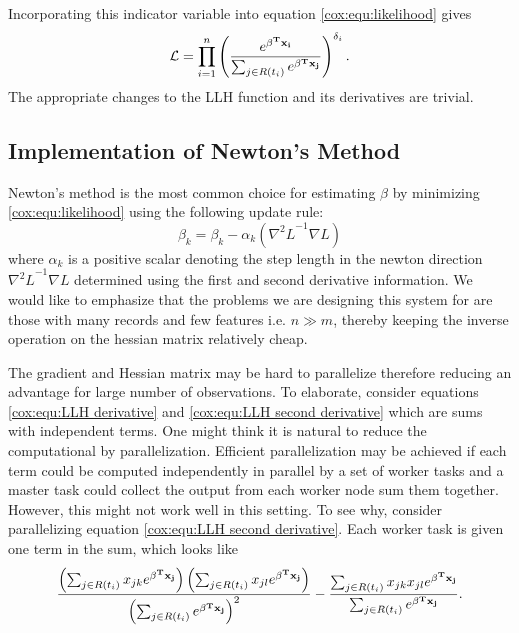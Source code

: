 Incorporating this indicator variable into equation \ref{cox:equ:likelihood} gives
\begin{equation}\label{cox:equ:likelihood-censoring}
\mathcal{L} = \prod_{i = 1}^n \left(  \frac{e^{\bold{\beta^T x_i} }}{ \sum_{j \in R(t_i)} e^{\bold{\beta^T x_j}}} \right)^{\delta_i}.
\end{equation}
The appropriate changes to the LLH function and its derivatives are trivial.


\subsection{Implementation of Newton's Method}
Newton's method is the most common choice for estimating $\beta$ by minimizing
\ref{cox:equ:likelihood} using the following update rule:
\begin{equation}
\beta_{k} = \beta_{k} - \alpha_k \left( {\nabla^2 L}^{-1} \nabla L \right)
\end{equation}
where $\alpha_k$ is a positive scalar denoting the step length in the newton
direction ${\nabla^2 L}^{-1} \nabla L$ determined using the first and second
derivative information. We would like to emphasize that the problems we are
designing this system for are those with many records and few features i.e. $n
\gg m$, thereby keeping the inverse operation on the hessian matrix relatively
cheap.

The gradient and Hessian matrix may be hard to parallelize therefore reducing an
advantage for large number of observations. To elaborate, consider equations
\ref{cox:equ:LLH derivative} and \ref{cox:equ:LLH second derivative} which are
sums with independent terms. One might think it is natural to reduce the
computational by parallelization. Efficient parallelization may be achieved if
each term could be computed independently in parallel by a set of worker tasks
and a master task could collect the output from each worker node sum them
together. However, this might not work well in this setting. To see why,
consider parallelizing equation \ref{cox:equ:LLH second derivative}.  Each
worker task is given one term in the sum, which looks like
\begin{equation}
 \frac{\left(  \sum_{j \in R(t_i)} x_{jk} e^{\bold{\beta^T x _j} } \right) \left(  \sum_{j \in R(t_i)} x_{jl} e^{\bold{\beta^T x _j} } \right)}{\left( \sum_{j \in R(t_i)} e^{\bold{\beta^T x_j} } \right)^2 }   -  \frac{  \sum_{j \in R(t_i)} x_{jk}x_{jl} e^{\bold{\beta^T x_j} } }{\sum_{j \in R(t_i)} e^{\bold{\beta^T x_j} } }.
\end{equation}

